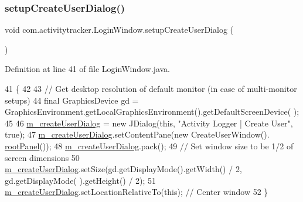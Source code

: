 \subsubsection{\texorpdfstring{setup\+Create\+User\+Dialog()}{setupCreateUserDialog()}}
{\footnotesize\ttfamily void com.\+activitytracker.\+Login\+Window.\+setup\+Create\+User\+Dialog (\begin{DoxyParamCaption}{ }\end{DoxyParamCaption})\hspace{0.3cm}{\ttfamily [private]}}



Definition at line 41 of file Login\+Window.\+java.


\begin{DoxyCode}
41                                          \{
42 
43         \textcolor{comment}{// Get desktop resolution of default monitor (in case of multi-monitor setups)}
44         \textcolor{keyword}{final} GraphicsDevice gd = GraphicsEnvironment.getLocalGraphicsEnvironment().getDefaultScreenDevice(
      );
45 
46         \mbox{\hyperlink{classcom_1_1activitytracker_1_1_login_window_a49ff7093e29ce7bd22c42ac8099d5d34}{m\_createUserDialog}} = \textcolor{keyword}{new} JDialog(\textcolor{keyword}{this}, \textcolor{stringliteral}{"Activity Logger | Create User"}, \textcolor{keyword}{true});
47         \mbox{\hyperlink{classcom_1_1activitytracker_1_1_login_window_a49ff7093e29ce7bd22c42ac8099d5d34}{m\_createUserDialog}}.setContentPane(\textcolor{keyword}{new} CreateUserWindow().
      \mbox{\hyperlink{classcom_1_1activitytracker_1_1_login_window_ab1ea45e86bbb79bccd06531279f1e443}{rootPanel}}());
48         \mbox{\hyperlink{classcom_1_1activitytracker_1_1_login_window_a49ff7093e29ce7bd22c42ac8099d5d34}{m\_createUserDialog}}.pack();
49         \textcolor{comment}{// Set window size to be 1/2 of screen dimensions}
50         \mbox{\hyperlink{classcom_1_1activitytracker_1_1_login_window_a49ff7093e29ce7bd22c42ac8099d5d34}{m\_createUserDialog}}.setSize(gd.getDisplayMode().getWidth() / 2, gd.getDisplayMode(
      ).getHeight() / 2);
51         \mbox{\hyperlink{classcom_1_1activitytracker_1_1_login_window_a49ff7093e29ce7bd22c42ac8099d5d34}{m\_createUserDialog}}.setLocationRelativeTo(\textcolor{keyword}{this}); \textcolor{comment}{// Center window}
52     \}
\end{DoxyCode}
\mbox{\label{classcom_1_1activitytracker_1_1_login_window_a7af9edf52b3028437e2159f0be9893a9}} 
